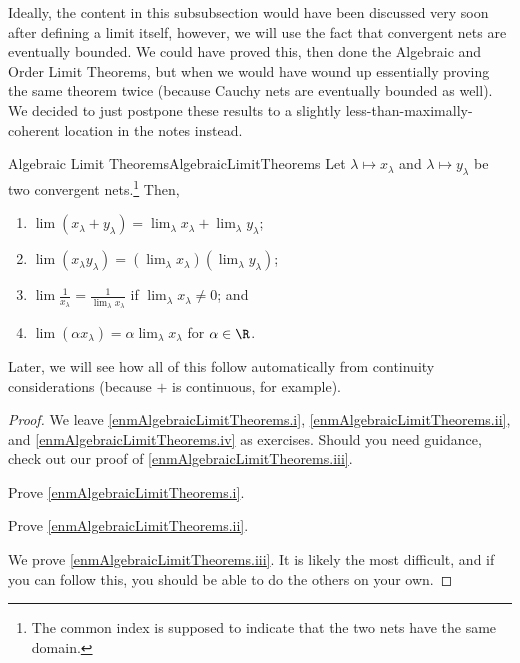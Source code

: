 Ideally, the content in this subsubsection would have been discussed very soon after defining a limit itself, however, we will use the fact that convergent nets are eventually bounded.  We could have proved this, then done the Algebraic and Order Limit Theorems, but when we would have wound up essentially proving the same theorem twice (because Cauchy nets are eventually bounded as well).  We decided to just postpone these results to a slightly less-than-maximally-coherent location in the notes instead.
\begin{prp}{Algebraic Limit Theorems}{AlgebraicLimitTheorems}
Let $\lambda \mapsto x_\lambda$ and $\lambda \mapsto y_\lambda$ be two convergent nets.\footnote{The common index is supposed to indicate that the two nets have the same domain.}  Then,
\begin{enumerate}
\item \label{enmAlgebraicLimitTheorems.i}$\lim (x_\lambda +y_\lambda )=\lim _{\lambda}x_{\lambda}+\lim _{\lambda}y_{\lambda}$;
\item \label{enmAlgebraicLimitTheorems.ii}$\lim (x_\lambda y_\lambda )=\left( \lim _{\lambda}x_{\lambda}\right) \left( \lim _{\lambda}y_{\lambda}\right)$;
\item \label{enmAlgebraicLimitTheorems.iii}$\lim \frac{1}{x_\lambda}=\frac{1}{\lim _{\lambda}x_{\lambda}}$ if $\lim _{\lambda}x_{\lambda}\neq 0$; and
\item \label{enmAlgebraicLimitTheorems.iv}$\lim (\alpha x_\lambda )=\alpha \lim _{\lambda}x_{\lambda}$ for $\alpha \in \R$.
\end{enumerate}
\begin{rmk}
Later, we will see how all of this follow automatically from continuity considerations (because $+$ is continuous, for example).
\end{rmk}
\begin{proof}
We leave \cref{enmAlgebraicLimitTheorems.i}, \cref{enmAlgebraicLimitTheorems.ii}, and \cref{enmAlgebraicLimitTheorems.iv} as exercises.  Should you need guidance, check out our proof of \cref{enmAlgebraicLimitTheorems.iii}.
\begin{exr}[breakable=false]{}{}
Prove \cref{enmAlgebraicLimitTheorems.i}.
\end{exr}
\begin{exr}[breakable=false]{}{}
Prove \cref{enmAlgebraicLimitTheorems.ii}.
\end{exr}
We prove \cref{enmAlgebraicLimitTheorems.iii}.  It is likely the most difficult, and if you can follow this, you should be able to do the others on your own.


\end{proof}
\end{prp}

